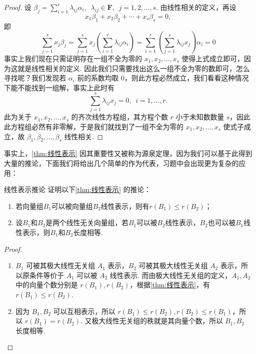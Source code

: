 \begin{proof}
    设 $\beta_j = \displaystyle\sum_{i = 1}^r \lambda_{ij} \alpha_i,\enspace \lambda_{ij} \in \mathbf{F},\enspace j = 1, 2, \ldots, s$. 由线性相关的定义，再设
    \[x_1\beta_1 + x_2\beta_2 + \cdots + x_s\beta_s = 0,\]
    即
    \[\sum_{j = 1}^s x_j\beta_j = \sum_{j = 1}^s x_j\left(\sum_{i = 1}^r \lambda_{ij} \alpha_i\right) = \sum_{i = 1}^r \left(\sum_{j = 1}^s \lambda_{ij}x_j\right)\alpha_i = 0\]
    事实上我们现在只需证明存在一组不全为零的 $x_1, x_2, \ldots, x_s$ 使得上式成立即可，因为这就是线性相关的定义. 因此我们只需要找出这么一组不全为零的数即可，怎么寻找呢？我们发现若 $\alpha_i$ 前的系数均取 0，则此方程必然成立，我们看看这种情况下能不能找到一组解，事实上此时有
    \[\sum_{j = 1}^s \lambda_{ij}x_j = 0,\enspace i = 1, \ldots, r.\]
    此为关于 $x_1, x_2, \ldots, x_s$ 的齐次线性方程组，其方程个数 $r$ 小于未知数数量 $s$，因此此方程组必然有非零解，于是我们就找到了一组不全为零的 $x_1, x_2, \ldots, x_s$ 使式子成立，故 $ \beta_1,\beta_2,\ldots,\beta_s $ 线性相关.
\end{proof}

事实上，\autoref{thm:线性表示} 因其重要性又被称为源泉定理，因为我们可以基于此得到大量的推论，下面我们将给出几个简单的作为代表，习题中会出现更为复杂的应用：
\begin{example}{}{线性表示推论}
    证明以下\autoref*{thm:线性表示} 的推论：
    \begin{enumerate}[label=(\arabic*)]
        \item 若向量组$B_1$可以被向量组$B_2$线性表示，则有$r(B_1)\leqslant r(B_2)$；

        \item \label{item:3:线性表示推论:2}
              设$B_1$和$B_2$是两个线性无关向量组，若$B_1$可以被$B_2$线性表示，$B_2$也可以被$B_1$线性表示，则$B_1$和$B_2$长度相等.
    \end{enumerate}
\end{example}

\begin{proof}
    \begin{enumerate}
        \item $B_1$ 可被其极大线性无关组 $A_1$ 表示，$B_2$ 可被其极大线性无关组 $A_2$ 表示，所以原条件等价于 $A_1$ 可以被 $A_2$ 线性表示. 而由极大线性无关组的定义，$A_1, A_2$ 中的向量个数分别是 $r(B_1), r(B_2)$，根据\autoref{thm:线性表示}，有 $r(B_1)\leqslant r(B_2)$.

        \item 因为 $B_1, B_2$ 可以互相表示，所以 $r(B_1) \leqslant r(B_2),r(B_2) \leqslant r(B_1)$，所以 $r(B_1) = r(B_2)$. 又极大线性无关组的秩就是其向量个数，所以 $B_1, B_2$ 长度相等.
    \end{enumerate}
\end{proof}

